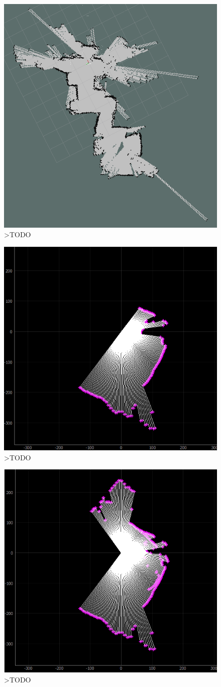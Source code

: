 \begin{figure}[ht]
	\centering
		\includegraphics[width=0.8\linewidth]{rys/2020-11-04-170347_1920x1080_scrot.PNG}
	\caption{>TODO}
	\label{fig:xxx}
\end{figure}


\begin{figure}[ht]
	\centering
		\includegraphics[width=0.5\linewidth]{rys/ScanBot-12-calibrated-room-map1.PNG}
	\caption{>TODO}
	\label{fig:xxx}
\end{figure}

\begin{figure}[ht]
	\centering
		\includegraphics[width=0.5\linewidth]{rys/ScanBot-12-calibrated-room-map2.PNG}
	\caption{>TODO}
	\label{fig:xxx}
\end{figure}

